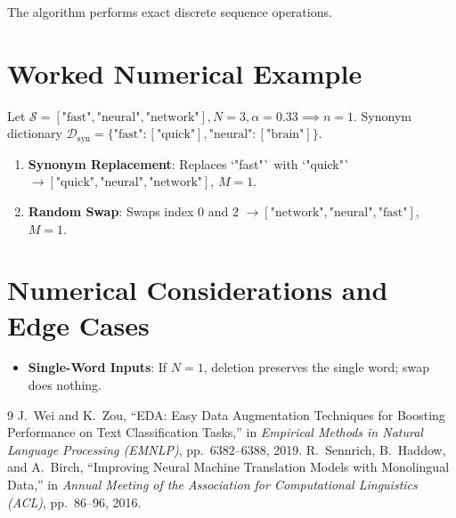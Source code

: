 \documentclass[11pt,a4paper]{article}
\theoremstyle{definition}
\begin{document}
The algorithm performs exact discrete sequence operations.

\section{Worked Numerical Example}

Let $\mathcal{S} = [\text{"fast"}, \text{"neural"}, \text{"network"}], N = 3, \alpha = 0.33 \implies n = 1$.
Synonym dictionary $\mathcal{D}_{\text{syn}} = \{\text{"fast"}: [\text{"quick"}], \text{"neural"}: [\text{"brain"}]\}$.

\begin{enumerate}
    \item \textbf{Synonym Replacement}: Replaces `"fast"` with `"quick"` $\to [\text{"quick"}, \text{"neural"}, \text{"network"}]$, $M = 1$.
    \item \textbf{Random Swap}: Swaps index 0 and 2 $\to [\text{"network"}, \text{"neural"}, \text{"fast"}]$, $M = 1$.
\end{enumerate}

\section{Numerical Considerations and Edge Cases}

\begin{itemize}
    \item \textbf{Single-Word Inputs}: If $N = 1$, deletion preserves the single word; swap does nothing.
\end{itemize}

\begin{thebibliography}{9}
 J.~Wei and K.~Zou, ``EDA: Easy Data Augmentation Techniques for Boosting Performance on Text Classification Tasks,'' in \emph{Empirical Methods in Natural Language Processing (EMNLP)}, pp.~6382--6388, 2019.
 R.~Sennrich, B.~Haddow, and A.~Birch, ``Improving Neural Machine Translation Models with Monolingual Data,'' in \emph{Annual Meeting of the Association for Computational Linguistics (ACL)}, pp.~86--96, 2016.
\end{thebibliography}
\end{document}
